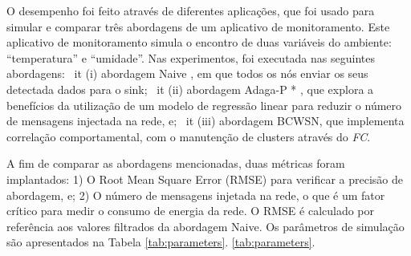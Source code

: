 \documentclass{acm_proc_article-sp}
\begin{document}
O desempenho foi feito através de diferentes aplicações, que foi usado
para simular e comparar três abordagens de um aplicativo de monitoramento. 
Este aplicativo de monitoramento simula o encontro de duas variáveis
do ambiente: ``temperatura'' e ``umidade''.
Nas experimentos, foi executada nas seguintes abordagens: {\ it 
 (i)} abordagem Naive \cite {Madden2005}, em que todos os nós enviar
os seus detectada dados para o sink; {\ it 
 (ii)} abordagem Adaga-P * \cite {MaiaACR2013}, que explora a 
benefícios da utilização de um modelo de regressão linear para 
reduzir o número de mensagens injectada na rede, e; {\ it 
 (iii)} abordagem BCWSN, que implementa correlação comportamental, com o 
 manutenção de clusters através do \textit{FC}.
\vspace*{-.3cm}

A fim de comparar as abordagens mencionadas, duas métricas foram implantados:
1) O Root Mean Square Error (RMSE) para verificar a precisão de abordagem,
e; 2) O número de mensagens injetada na rede, o que é um fator crítico 
para medir o consumo de energia da rede. O RMSE é calculado por referência
aos valores filtrados da abordagem Naive. Os parâmetros de simulação são
apresentados na Tabela \ref{tab:parameters}.
\ref{tab:parameters}.
\end{document}
